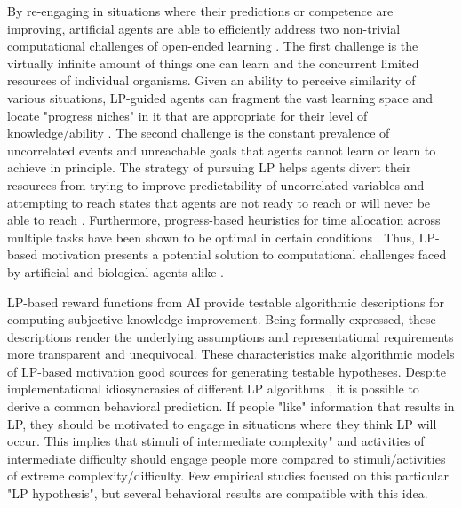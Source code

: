 By re-engaging in situations where their predictions or competence are improving, artificial agents are able to efficiently address two non-trivial computational challenges of open-ended learning \cite{gottlieb_information-seeking_2013}. The first challenge is the virtually infinite amount of things one can learn and the concurrent limited resources of individual organisms. Given an ability to perceive similarity of various situations, \ac{LP}-guided agents can fragment the vast learning space and locate "progress niches" in it that are appropriate for their level of knowledge/ability \cite[e.g. ][]{oudeyer_intrinsic_2007,forestier_intrinsically_2020,etcheverry_hierarchically_2021}. The second challenge is the constant prevalence of uncorrelated events and unreachable goals that agents cannot learn or learn to achieve in principle. The strategy of pursuing \ac{LP} helps agents divert their resources from trying to improve predictability of uncorrelated variables and attempting to reach states that agents are not ready to reach or will never be able to reach \cite[e.g., ][]{forestier_intrinsically_2020, colas_curious_2019}. Furthermore, progress-based heuristics for time allocation across multiple tasks have been shown to be optimal in certain conditions \cite{son_metacognitive_2006,lopes_strategic_2012}. Thus, \ac{LP}-based motivation presents a potential solution to computational challenges faced by artificial and biological agents alike \cite{gottlieb_information-seeking_2013,gottlieb_towards_2018,oudeyer_computational_2018}.

\ac{LP}-based reward functions from \ac{AI} provide testable algorithmic descriptions for computing subjective knowledge improvement. Being formally expressed, these descriptions render the underlying assumptions and representational requirements more transparent and unequivocal. These characteristics make algorithmic models of \ac{LP}-based motivation good sources for generating testable hypotheses. Despite implementational idiosyncrasies of different \ac{LP} algorithms \cite[see][]{oudeyer_intrinsic_2007,linke_adapting_2020}, it is possible to derive a common behavioral prediction. If people "like" information that results in \ac{LP}, they should be motivated to engage in situations where they think \ac{LP} will occur. This implies that stimuli of intermediate complexity" and activities of intermediate difficulty should engage people more compared to stimuli/activities of extreme complexity/difficulty. Few empirical studies focused on this particular "\ac{LP} hypothesis", but several behavioral results are compatible with this idea.

